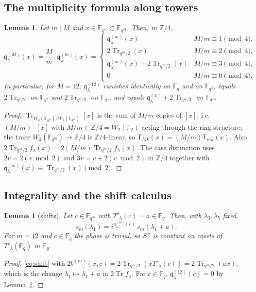 ﻿\documentclass[12pt,a4paper]{amsart}
\newtheorem{lemma}[theorem]{Lemma}
\theoremstyle{definition}
\newcommand{\F}{\mathbb{F}}
\newcommand{\Z}{\mathbb{Z}}
\newcommand{\Tr}{\operatorname{Tr}}
\newcommand{\qq}{\mathfrak{q}}
\newcommand{\Spp}{S''}
\begin{document}
\subsection{The multiplicity formula along towers}
\begin{lemma}\label{lem:multiplicity}
Let $m\mid M$ and $x\in\F_{q^m}\subset\F_{q^M}$. Then, in $\Z/4$,
\[
\qq^{(M)}_\lambda(x)=\frac Mm\cdot\qq^{(m)}_\lambda(x)=
\begin{cases}
\qq^{(m)}_\lambda(x)&M/m\equiv1\pmod4,\\
2\Tr_{q^m/2}(x)&M/m\equiv2\pmod4,\\
\qq^{(m)}_\lambda(x)+2\Tr_{q^m/2}(x)&M/m\equiv3\pmod4,\\
0&M/m\equiv0\pmod4.
\end{cases}
\]
In particular, for $M=12$: $\qq^{(12)}_\lambda$ vanishes identically on $\F_q$ and on $\F_{q^3}$, equals $2\Tr_{q^2/2}$ on $\F_{q^2}$ and $2\Tr_{q^6/2}$ on $\F_{q^6}$, and equals $\qq^{(4)}_\lambda+2\Tr_{q^4/2}$ on $\F_{q^4}$.
\end{lemma}
\begin{proof}
$\Tr_{W_2(\F_{q^M})/W_2(\F_{q^m})}[x]$ is the sum of $M/m$ copies of $[x]$, i.e.\ $(M/m)\cdot[x]$ with $M/m\in\Z/4=W_2(\F_2)$ acting through the ring structure; the trace $W_2(\F_{q^m})\to\Z/4$ is $\Z/4$-linear, so $\mathsf T_{Mk}(x)=(M/m)\mathsf T_{mk}(x)$. Also $2\Tr_{q^M/2}f_\lambda(x)=2(M/m)\Tr_{q^m/2}f_\lambda(x)$. The case distinction uses $2v=2(v\bmod2)$ and $3v=v+2(v\bmod2)$ in $\Z/4$ together with $\qq^{(m)}_\lambda(x)\equiv\Tr_{q^m/2}(x)\pmod2$.
\end{proof}

\subsection{Integrality and the shift calculus}
\begin{lemma}[shifts]\label{lem:wittshift}
Let $c\in\F_{q^m}$ with $T'_\lambda(c)=a\in\F_q$. Then, with $\lambda_3,\lambda_5$ fixed,
\[
s_m(\lambda_1)=i^{\qq^{(m)}_\lambda(c)}\,s_m(\lambda_1+a).
\]
For $m=12$ and $c\in\F_q$ the phase is trivial, so $\Spp$ is constant on cosets of $T'_\lambda(\F_q)$ in $\F_q$.
\end{lemma}
\begin{proof}
\eqref{eq:shift} with $2b^{(m)}(x,c)=2\Tr_{q^m/2}(xT'_\lambda(c))=2\Tr_{q^m/2}(ax)$, which is the change $\lambda_1\mapsto\lambda_1+a$ in $2\Tr f_\lambda$. For $c\in\F_q$, $\qq^{(12)}_\lambda(c)=0$ by Lemma~\ref{lem:multiplicity}.
\end{proof}
\end{document}
